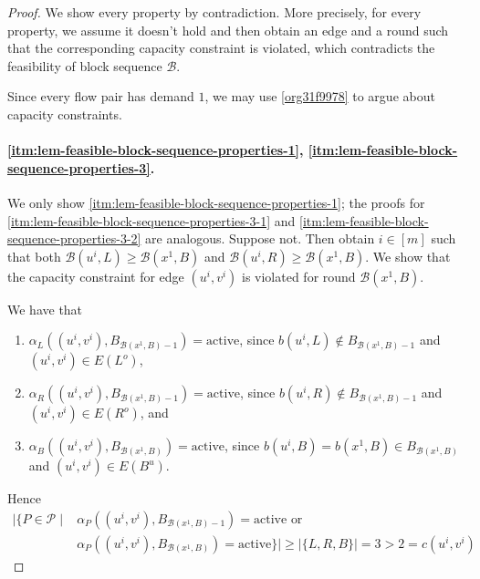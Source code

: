 \documentclass[fontsize=11pt,paper=a4]{book}
\begin{document}
\begin{proof}
We show every property by contradiction.
More precisely, for every property, we assume it doesn't hold and then obtain an edge and a round such that the corresponding capacity constraint is violated, which contradicts the feasibility of block sequence \(\mathcal{B}\).

Since every flow pair has demand \(1\), we may use \ref{org31f9978} to argue about capacity constraints.

\paragraph{\ref{itm:lem-feasible-block-sequence-properties-1}, \ref{itm:lem-feasible-block-sequence-properties-3}.}
We only show \ref{itm:lem-feasible-block-sequence-properties-1}; the proofs for \ref{itm:lem-feasible-block-sequence-properties-3-1} and \ref{itm:lem-feasible-block-sequence-properties-3-2} are analogous.
Suppose not.
Then obtain \(i\in[m]\) such that both \(\mathcal{B}(u^i,L)\geq\mathcal{B}(x^1,B)\) and \(\mathcal{B}(u^i,R)\geq\mathcal{B}(x^1,B)\).
We show that the capacity constraint for edge \((u^i,v^i)\) is violated for round \(\mathcal{B}(x^1,B)\).

We have that

\begin{enumerate}
\item \(\alpha_L((u^i,v^i),B_{\mathcal{B}(x^1,B)-1})=\mathrm{active}\), since \(b(u^i,L)\notin B_{\mathcal{B}(x^1,B)-1}\) and \((u^i,v^i)\in E(L^o)\),

\item \(\alpha_R((u^i,v^i),B_{\mathcal{B}(x^1,B)-1})=\mathrm{active}\), since \(b(u^i,R)\notin B_{\mathcal{B}(x^1,B)-1}\) and \((u^i,v^i)\in E(R^o)\), and

\item \(\alpha_B((u^i,v^i),B_{\mathcal{B}(x^1,B)})=\mathrm{active}\), since \(b(u^i,B)=b(x^1,B)\in B_{\mathcal{B}(x^1,B)}\) and \((u^i,v^i)\in E(B^u)\).
\end{enumerate}

Hence
\begin{align*}
\lvert\{P\in\mathcal{P}\mid&\alpha_P((u^i,v^i),B_{\mathcal{B}(x^1,B)-1})=\mathrm{active}\text{ or }\\
&\alpha_P((u^i,v^i),B_{\mathcal{B}(x^1,B)})=\mathrm{active}\}\rvert\geq\lvert\{L,R,B\}\rvert=3>2=c(u^i,v^i)
\end{align*}


\end{proof}
\end{document}
